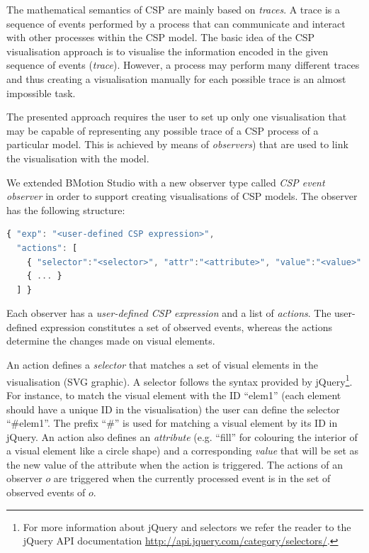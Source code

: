 The mathematical semantics of CSP are mainly based on \textit{traces}.
A trace is a sequence of events performed by a process that can communicate and interact with other processes within the CSP model.
The basic idea of the CSP visualisation approach is to visualise the information encoded in the given sequence of events (\textit{trace}).
However, a process may perform many different traces and thus creating a visualisation manually for each possible trace is an almost impossible task.

The presented approach requires the user to set up only one visualisation that may be capable of representing any possible trace of a CSP process of a particular model. 
This is achieved by means of \textit{observers}) that are used to link the visualisation with the model.

We extended BMotion Studio with a new observer type called \textit{CSP event observer} in order to support creating visualisations of CSP models.
The observer has the following structure:

\begin{lstlisting}[language=JavaScript]
{ "exp": "<user-defined CSP expression>", 
  "actions": [ 
    { "selector":"<selector>", "attr":"<attribute>", "value":"<value>" },
    { ... }
  ] }
\end{lstlisting}

Each observer has a \textit{user-defined CSP expression} and a list of \textit{actions}.
The user-defined expression constitutes a set of observed events, whereas the actions determine the changes made on visual elements.

An action defines a \textit{selector} that matches a set of visual elements in the visualisation (SVG graphic). 
A selector follows the syntax provided by jQuery\footnote{For more information about jQuery and selectors we refer the reader to the jQuery API documentation \url{http://api.jquery.com/category/selectors/}.}. 
For instance, to match the visual element with the ID ``elem1'' (each element should have a unique ID in the visualisation) the user can define the selector ``\#elem1''. 
The prefix ``\#'' is used for matching a visual element by its ID in jQuery. 
An action also defines an \textit{attribute} (e.g. ``fill'' for colouring the interior of a visual element like a circle shape) and a corresponding \textit{value} that will be set as the new value of the attribute when the action is triggered.
The actions of an observer $o$ are triggered when the currently processed event is in the set of observed events of $o$.

